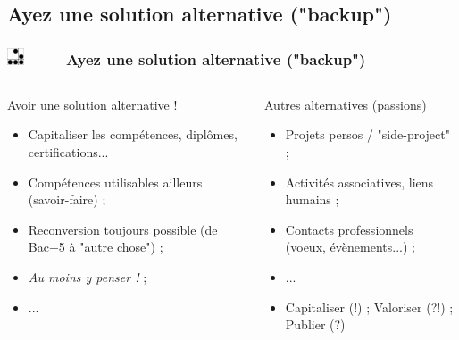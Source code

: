 \documentclass[slidetop,11pt]{beamer}
\def\sectionPartVd{Ayez une solution alternative ("backup")}
\def\moreInFrameTitle{\includegraphics[height=0.5cm]{img/logo_glider.png}~~~~~}
\begin{document}
\subsection{\sectionPartVd}
\begin{frame}
	\frametitle{\moreInFrameTitle \sectionPartVd}
	\begin{columns}[T]
	\begin{column}[T]{5.50cm}
		\begin{beamerboxesrounded}	[lower=substructureTR, %
		 				 upper=block title TR,%
						 shadow=true]%
		       {Avoir une solution alternative !}
			\begin{itemize}
				\item Capitaliser les comp{\'e}tences, dipl{\^o}mes, certifications...
				\item Comp{\'e}tences utilisables ailleurs (savoir-faire) ; 
				\item Reconversion toujours possible (de Bac+5 {\`a} "autre chose") ; 
				\item \emph{Au moins y penser !} ; 
				\item ... 
			\end{itemize}
		\end{beamerboxesrounded}
	\end{column}
	\begin{column}[T]{5.50cm}
		\begin{beamerboxesrounded}	[lower=substructureUN, %
		 				 upper=block title UN,%
						 shadow=true]%
		       {Autres alternatives (passions)}
			\begin{itemize}
				\item Projets persos / "side-project" ; 
				\item Activit{\'e}s associatives, liens humains ; 
				\item Contacts professionnels (voeux, {\'e}v{\`e}nements...) ; 
				\item ... 
				\item Capitaliser (!) ; Valoriser (?!) ; Publier (?)
			\end{itemize}
		\end{beamerboxesrounded}
	\end{column}
	\end{columns}
\end{frame}
\end{document}
